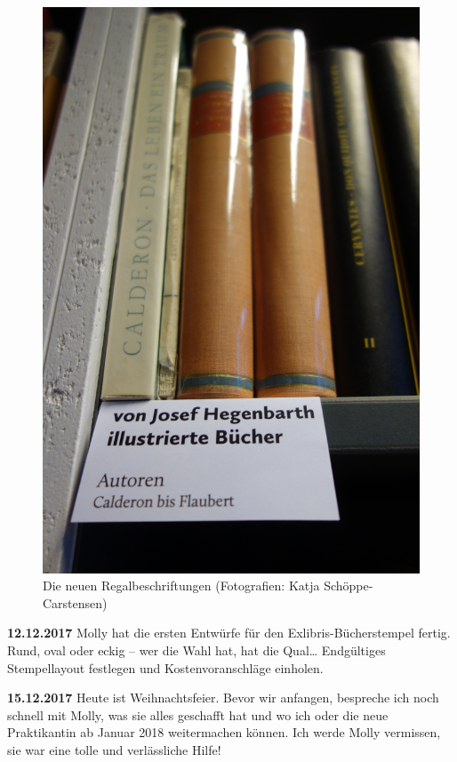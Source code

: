 \documentclass[a4paper,
fontsize=11pt,
oneside,
numbers=noperiodatend,
parskip=half-,
bibliography=totoc,
final
]{scrartcl}
\begin{document}
\begin{figure}
\centering
\includegraphics{img/Schoeppe_6.jpg}
\caption{Die neuen Regalbeschriftungen (Fotografien: Katja
Schöppe-Carstensen)}
\end{figure}

\textbf{12.12.2017} Molly hat die ersten Entwürfe für den
Exlibris-Bücherstempel fertig. Rund, oval oder eckig -- wer die Wahl
hat, hat die Qual\ldots{} Endgültiges Stempellayout festlegen und
Kostenvoranschläge einholen.

\textbf{15.12.2017} Heute ist Weihnachtsfeier. Bevor wir anfangen,
bespreche ich noch schnell mit Molly, was sie alles geschafft hat und wo
ich oder die neue Praktikantin ab Januar 2018 weitermachen können. Ich
werde Molly vermissen, sie war eine tolle und verlässliche Hilfe!
\end{document}
